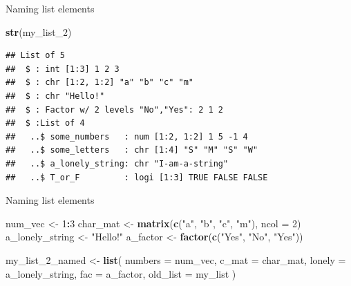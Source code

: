 \documentclass[ignorenonframetext,]{beamer}
\newenvironment{Shaded}{\begin{snugshade}}{\end{snugshade}}
\newcommand{\DataTypeTok}[1]{\textcolor[rgb]{0.13,0.29,0.53}{#1}}
\newcommand{\DecValTok}[1]{\textcolor[rgb]{0.00,0.00,0.81}{#1}}
\newcommand{\KeywordTok}[1]{\textcolor[rgb]{0.13,0.29,0.53}{\textbf{#1}}}
\newcommand{\NormalTok}[1]{#1}
\newcommand{\OperatorTok}[1]{\textcolor[rgb]{0.81,0.36,0.00}{\textbf{#1}}}
\newcommand{\StringTok}[1]{\textcolor[rgb]{0.31,0.60,0.02}{#1}}
\begin{document}
\begin{frame}[fragile]{Naming list elements}
\protect\hypertarget{naming-list-elements-4}{}

\begin{Shaded}
\begin{Highlighting}[]
\KeywordTok{str}\NormalTok{(my_list_}\DecValTok{2}\NormalTok{)}
\end{Highlighting}
\end{Shaded}

\begin{verbatim}
## List of 5
##  $ : int [1:3] 1 2 3
##  $ : chr [1:2, 1:2] "a" "b" "c" "m"
##  $ : chr "Hello!"
##  $ : Factor w/ 2 levels "No","Yes": 2 1 2
##  $ :List of 4
##   ..$ some_numbers   : num [1:2, 1:2] 1 5 -1 4
##   ..$ some_letters   : chr [1:4] "S" "M" "S" "W"
##   ..$ a_lonely_string: chr "I-am-a-string"
##   ..$ T_or_F         : logi [1:3] TRUE FALSE FALSE
\end{verbatim}

\end{frame}

\begin{frame}[fragile]{Naming list elements}
\protect\hypertarget{naming-list-elements-5}{}

\begin{Shaded}
\begin{Highlighting}[]
\NormalTok{num_vec <-}\StringTok{ }\DecValTok{1}\OperatorTok{:}\DecValTok{3}
\NormalTok{char_mat <-}\StringTok{ }\KeywordTok{matrix}\NormalTok{(}\KeywordTok{c}\NormalTok{(}\StringTok{"a"}\NormalTok{, }\StringTok{"b"}\NormalTok{, }\StringTok{"c"}\NormalTok{, }\StringTok{"m"}\NormalTok{), }\DataTypeTok{ncol =} \DecValTok{2}\NormalTok{)}
\NormalTok{a_lonely_string <-}\StringTok{ "Hello!"}
\NormalTok{a_factor <-}\StringTok{ }\KeywordTok{factor}\NormalTok{(}\KeywordTok{c}\NormalTok{(}\StringTok{"Yes"}\NormalTok{, }\StringTok{"No"}\NormalTok{, }\StringTok{"Yes"}\NormalTok{))}

\NormalTok{my_list_}\DecValTok{2}\NormalTok{_named <-}\StringTok{ }\KeywordTok{list}\NormalTok{(}
  \DataTypeTok{numbers =}\NormalTok{ num_vec,}
  \DataTypeTok{c_mat =}\NormalTok{ char_mat,}
  \DataTypeTok{lonely =}\NormalTok{ a_lonely_string,}
  \DataTypeTok{fac =}\NormalTok{ a_factor,}
  \DataTypeTok{old_list =}\NormalTok{ my_list }
\NormalTok{  )}
\end{Highlighting}
\end{Shaded}

\end{frame}
\end{document}
